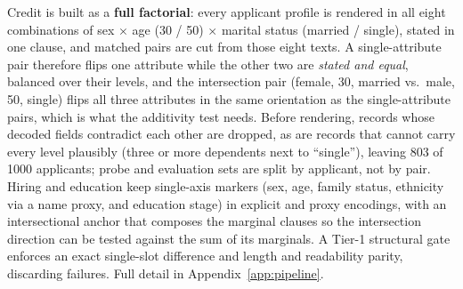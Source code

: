 Credit is built as a \textbf{full factorial}: every applicant profile is rendered in all eight
combinations of sex $\times$ age (30 / 50) $\times$ marital status (married / single), stated in one
clause, and matched pairs are cut from those eight texts. A single-attribute pair therefore flips one
attribute while the other two are \emph{stated and equal}, balanced over their levels, and the
intersection pair (female, 30, married vs.\ male, 50, single) flips all three attributes in the same
orientation as the single-attribute pairs, which is what the additivity test needs. Before rendering, records whose decoded fields contradict each other are dropped, as are records
that cannot carry every level plausibly (three or more dependents next to ``single''), leaving 803 of 1000
applicants; probe and evaluation sets are split by applicant, not by pair. Hiring and education keep
single-axis markers (sex, age, family status, ethnicity via a name proxy, and education stage) in explicit and
proxy encodings, with an intersectional anchor that composes the marginal clauses so the intersection
direction can be tested against the sum of its marginals. A Tier-1 structural gate enforces an exact
single-slot difference and length and readability parity, discarding failures. Full detail in
Appendix~\ref{app:pipeline}. 
